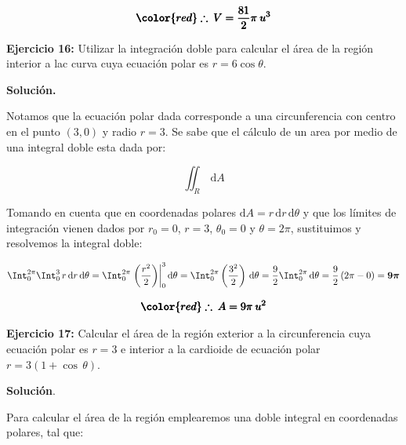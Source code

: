 \documentclass[12pt]{article}
\begin{document}
\begin{align*}
	\pmb{\color{red} \therefore\: V = \frac{81}{2}\pi\: u^3}
\end{align*}

\noindent \textbf{Ejercicio 16:} Utilizar la integración doble para calcular el área de la región interior a lac curva cuya ecuación polar es $r=6\cos\theta$.

\vspace{5mm}

\noindent \textbf{Solución.}

\vspace{3mm}

\noindent Notamos que la ecuación polar dada corresponde a una circunferencia con centro en el punto $(3, 0)$ y radio $r=3$. Se sabe que el cálculo de un area por medio de una integral doble esta dada por:

\begin{equation*}
	\iint_R\, \mathrm{d}A
\end{equation*}

\noindent Tomando en cuenta que en coordenadas polares $\mathrm{d}A = r\,\mathrm{d}r\,\mathrm{d}\theta$ y que los límites de integración vienen dados por $r_0 = 0$, $r = 3$, $\theta_0 = 0$ y $\theta = 2\pi$, sustituimos y resolvemos la integral doble:

\begin{align*}
	\Int_0^{2\pi} \Int_0^3\, r\,\mathrm{d}r\,\mathrm{d}\theta = \Int_0^{2\pi} \left.\left(\frac{r^2}{2}\right)\right|_0^3\mathrm{d}\theta = \Int_0^{2\pi} \left(\frac{3^2}{2}\right)\,\mathrm{d}\theta = \frac{9}{2}\Int_0^{2\pi} \,\mathrm{d}\theta = \frac{9}{2}\left(2\pi - 0\right) = \boldsymbol{9\pi}
\end{align*}

\begin{align*}
	\pmb{\color{red} \therefore\: A = 9\pi\: u^2}
\end{align*}

\noindent \textbf{Ejercicio 17:} Calcular el área de la región exterior a la circunferencia cuya ecuación polar es $r=3$ e interior a la cardioide de ecuación polar $r=3(1+\cos\,\theta)$.

\vspace{5mm}

\noindent \textbf{Solución}.

\vspace{3mm}

\noindent Para calcular el área de la región emplearemos una doble integral en coordenadas polares, tal que:
\end{document}
